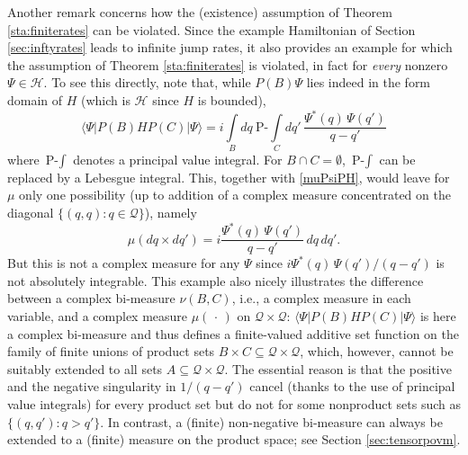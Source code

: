 \documentclass[12pt]{article}
\newcommand{\I}{i} %
\newcommand{\1}{\mathbf{1}} %
\newcommand{\Hilbert}{\mathscr{H}}
\renewcommand{\sp}[2]{\langle #1 | #2 \rangle} %
\newcommand{\conf}{\mathcal{Q}} %
\newcommand{\pov}{{P}}%
\begin{document}
Another remark concerns how the (existence)  assumption of Theorem
\ref{sta:finiterates} can be violated.  Since the example Hamiltonian
of Section \ref{sec:inftyrates} leads to infinite jump rates, it also
provides an example for which the assumption of Theorem
\ref{sta:finiterates} is violated, in fact  for \emph{every} nonzero
$\Psi \in \Hilbert$. To see this directly, note that, while $\pov(B)
\Psi$ lies indeed in the form domain of $H$ (which is $\Hilbert$ since 
$H$
is bounded),
\[
   \sp{\Psi}{\pov(B) H \pov(C) |\Psi} = \I \int\limits_{B} dq \:
   \text{P-}\!\int\limits_{C} dq' \, \frac{\Psi^*(q) \, \Psi(q')}{q-q'}
\]
where $\text{P-}\int$ denotes a principal value integral. For $B \cap
C = \emptyset$, $\text{P-}\int$ can be replaced by a Lebesgue
integral. This, together with \eqref{muPsiPH}, would leave for $\mu$
only one possibility (up to addition of a complex measure concentrated
on the diagonal $\{(q,q): q \in \conf\}$), namely
\[
   \mu(dq \times dq') = \I \frac{\Psi^*(q) \, \Psi(q')}{q-q'}\, dq\, dq'.
\]
But this is not a complex measure for any $\Psi$ since $\I \Psi^*(q)
\, \Psi(q')/(q-q')$ is not absolutely integrable.  This example also
nicely illustrates the difference between a complex bi-measure
$\nu(B,C)$, i.e., a complex measure in each variable, and a complex
measure $\mu(\,\cdot\,)$ on $\conf \times \conf$: $\sp{\Psi} {\pov(B)
H \pov(C) |\Psi}$ is here a complex bi-measure and thus defines a
finite-valued additive set function on the family of finite unions of
product sets $B \times C \subseteq \conf \times \conf$, which,
however, cannot be suitably extended to all sets $A \subseteq \conf
\times \conf$. The essential reason is that the positive and the
negative singularity in $1/(q-q')$ cancel (thanks to the use of
principal value integrals) for every product set but do not for some
nonproduct sets such as $\{(q,q'): q>q'\}$. In contrast, a (finite)
non-negative bi-measure can always be extended to a (finite) measure
on the product space; see Section \ref{sec:tensorpovm}.
\end{document}
